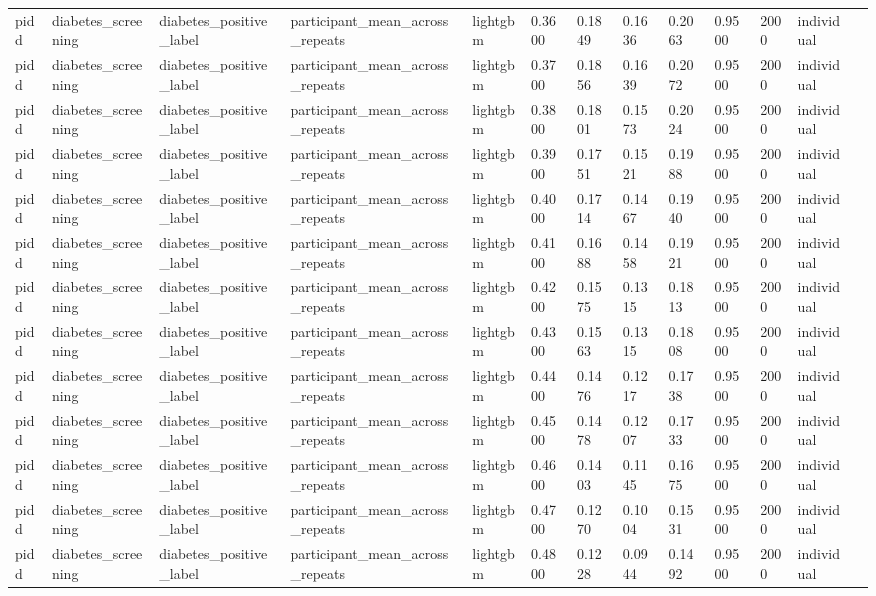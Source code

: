 \begin{tabular}{lllllllllllll}
pidd & diabetes\_screening & diabetes\_positive\_label & participant\_mean\_across\_repeats & lightgbm & 0.3600 & 0.1849 & 0.1636 & 0.2063 & 0.9500 & 2000 & individual &  \\
pidd & diabetes\_screening & diabetes\_positive\_label & participant\_mean\_across\_repeats & lightgbm & 0.3700 & 0.1856 & 0.1639 & 0.2072 & 0.9500 & 2000 & individual &  \\
pidd & diabetes\_screening & diabetes\_positive\_label & participant\_mean\_across\_repeats & lightgbm & 0.3800 & 0.1801 & 0.1573 & 0.2024 & 0.9500 & 2000 & individual &  \\
pidd & diabetes\_screening & diabetes\_positive\_label & participant\_mean\_across\_repeats & lightgbm & 0.3900 & 0.1751 & 0.1521 & 0.1988 & 0.9500 & 2000 & individual &  \\
pidd & diabetes\_screening & diabetes\_positive\_label & participant\_mean\_across\_repeats & lightgbm & 0.4000 & 0.1714 & 0.1467 & 0.1940 & 0.9500 & 2000 & individual &  \\
pidd & diabetes\_screening & diabetes\_positive\_label & participant\_mean\_across\_repeats & lightgbm & 0.4100 & 0.1688 & 0.1458 & 0.1921 & 0.9500 & 2000 & individual &  \\
pidd & diabetes\_screening & diabetes\_positive\_label & participant\_mean\_across\_repeats & lightgbm & 0.4200 & 0.1575 & 0.1315 & 0.1813 & 0.9500 & 2000 & individual &  \\
pidd & diabetes\_screening & diabetes\_positive\_label & participant\_mean\_across\_repeats & lightgbm & 0.4300 & 0.1563 & 0.1315 & 0.1808 & 0.9500 & 2000 & individual &  \\
pidd & diabetes\_screening & diabetes\_positive\_label & participant\_mean\_across\_repeats & lightgbm & 0.4400 & 0.1476 & 0.1217 & 0.1738 & 0.9500 & 2000 & individual &  \\
pidd & diabetes\_screening & diabetes\_positive\_label & participant\_mean\_across\_repeats & lightgbm & 0.4500 & 0.1478 & 0.1207 & 0.1733 & 0.9500 & 2000 & individual &  \\
pidd & diabetes\_screening & diabetes\_positive\_label & participant\_mean\_across\_repeats & lightgbm & 0.4600 & 0.1403 & 0.1145 & 0.1675 & 0.9500 & 2000 & individual &  \\
pidd & diabetes\_screening & diabetes\_positive\_label & participant\_mean\_across\_repeats & lightgbm & 0.4700 & 0.1270 & 0.1004 & 0.1531 & 0.9500 & 2000 & individual &  \\
pidd & diabetes\_screening & diabetes\_positive\_label & participant\_mean\_across\_repeats & lightgbm & 0.4800 & 0.1228 & 0.0944 & 0.1492 & 0.9500 & 2000 & individual &  \\

\end{tabular}
